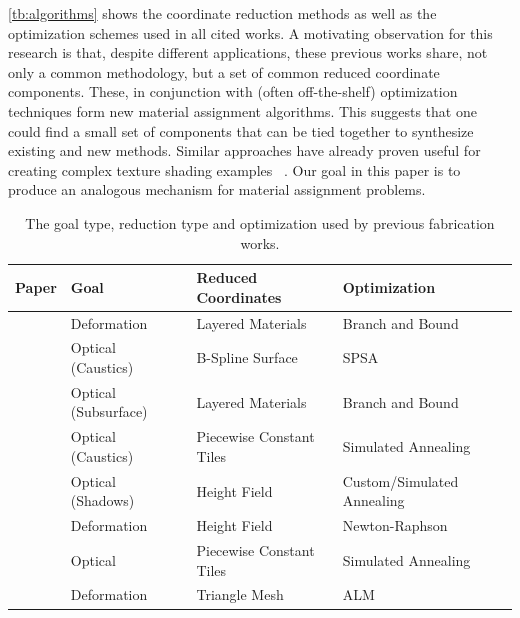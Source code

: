 \documentclass[annual]{acmsiggraph}
\begin{document}
\autoref{tb:algorithms} shows the coordinate reduction methods as well as the optimization schemes used in all cited works. A motivating observation for this research is that, despite different applications, these previous works share, not only a common methodology, but a set of common reduced coordinate components. These, in conjunction with (often off-the-shelf) optimization techniques form new material assignment algorithms. This suggests that one could find a small set of components that can be tied together to synthesize existing and new methods. Similar approaches have already proven useful for creating complex texture shading examples ~\cite{Cook1984}. Our goal in this paper is to produce an analogous mechanism for material assignment problems.
\begin{table}[htp]
\centering
\caption{The goal type, reduction type and optimization used by previous fabrication works.}
\begin{tabular}{clll}
\hline
\textbf{Paper} & \textbf{Goal} & \textbf{Reduced Coordinates}  & \textbf{Optimization} \\
\hline
~\cite{Bickel:2010}& Deformation & Layered Materials  & Branch and Bound \\
~\cite{Finckh:2010} & Optical (Caustics) & B-Spline Surface & SPSA \\
~\cite{Hasan:2010}& Optical (Subsurface) & Layered Materials & Branch and Bound\\
~\cite{Marios:2011} & Optical (Caustics) & Piecewise Constant Tiles & Simulated Annealing \\
~\cite{Bermano:2012} & Optical (Shadows) & Height Field & Custom/Simulated Annealing \\
~\cite{Bickel:2012} & Deformation &  Height Field &  Newton-Raphson \\
~\cite{Papas:2012} & Optical & Piecewise Constant Tiles & Simulated Annealing \\
~\cite{sko:2012}& Deformation & Triangle Mesh & ALM \\
\hline
\end{tabular}
\label{tb:algorithms}
\end{table}
\end{document}
